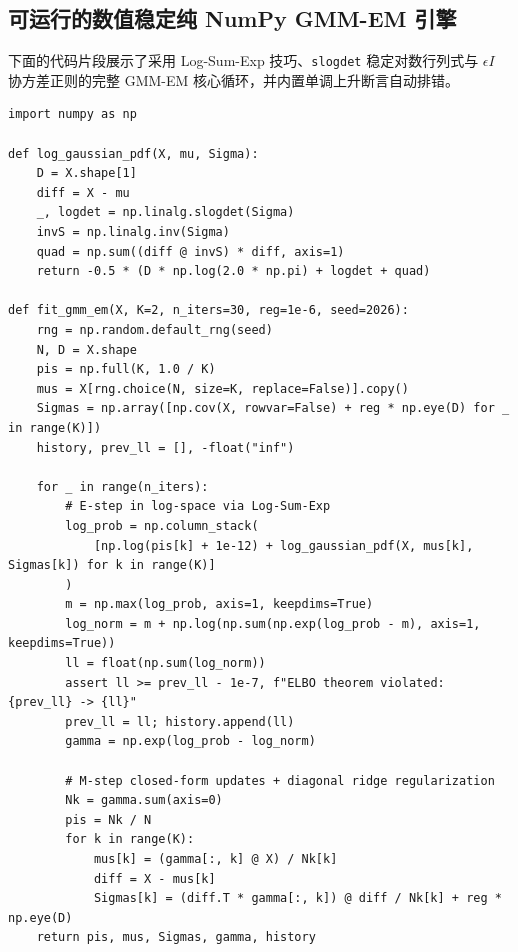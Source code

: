 \subsection{可运行的数值稳定纯 NumPy GMM-EM 引擎}

下面的代码片段展示了采用 Log-Sum-Exp 技巧、\texttt{slogdet} 稳定对数行列式与 $\epsilon I$ 协方差正则的完整 GMM-EM 核心循环，并内置单调上升断言自动排错。

\begin{lstlisting}[caption={数值稳定的纯 NumPy GMM-EM 实现（含 Log-Sum-Exp 与单调性断言）},label={lst:gmm-em}]
import numpy as np

def log_gaussian_pdf(X, mu, Sigma):
    D = X.shape[1]
    diff = X - mu
    _, logdet = np.linalg.slogdet(Sigma)
    invS = np.linalg.inv(Sigma)
    quad = np.sum((diff @ invS) * diff, axis=1)
    return -0.5 * (D * np.log(2.0 * np.pi) + logdet + quad)

def fit_gmm_em(X, K=2, n_iters=30, reg=1e-6, seed=2026):
    rng = np.random.default_rng(seed)
    N, D = X.shape
    pis = np.full(K, 1.0 / K)
    mus = X[rng.choice(N, size=K, replace=False)].copy()
    Sigmas = np.array([np.cov(X, rowvar=False) + reg * np.eye(D) for _ in range(K)])
    history, prev_ll = [], -float("inf")

    for _ in range(n_iters):
        # E-step in log-space via Log-Sum-Exp
        log_prob = np.column_stack(
            [np.log(pis[k] + 1e-12) + log_gaussian_pdf(X, mus[k], Sigmas[k]) for k in range(K)]
        )
        m = np.max(log_prob, axis=1, keepdims=True)
        log_norm = m + np.log(np.sum(np.exp(log_prob - m), axis=1, keepdims=True))
        ll = float(np.sum(log_norm))
        assert ll >= prev_ll - 1e-7, f"ELBO theorem violated: {prev_ll} -> {ll}"
        prev_ll = ll; history.append(ll)
        gamma = np.exp(log_prob - log_norm)

        # M-step closed-form updates + diagonal ridge regularization
        Nk = gamma.sum(axis=0)
        pis = Nk / N
        for k in range(K):
            mus[k] = (gamma[:, k] @ X) / Nk[k]
            diff = X - mus[k]
            Sigmas[k] = (diff.T * gamma[:, k]) @ diff / Nk[k] + reg * np.eye(D)
    return pis, mus, Sigmas, gamma, history
\end{lstlisting}

